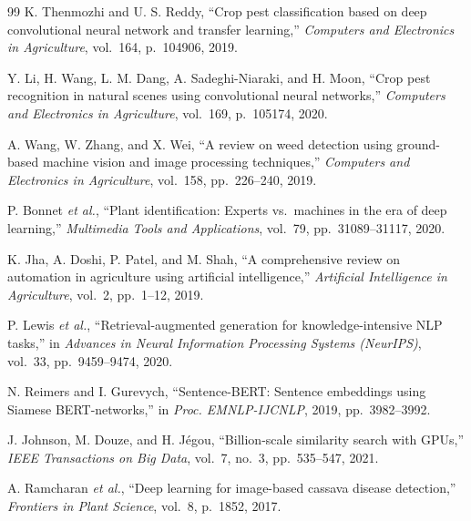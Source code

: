 \begin{thebibliography}{99}
K. Thenmozhi and U. S. Reddy, ``Crop pest classification based on deep convolutional neural network and transfer learning,'' \textit{Computers and Electronics in Agriculture}, vol.~164, p.~104906, 2019.

Y. Li, H. Wang, L. M. Dang, A. Sadeghi-Niaraki, and H. Moon, ``Crop pest recognition in natural scenes using convolutional neural networks,'' \textit{Computers and Electronics in Agriculture}, vol.~169, p.~105174, 2020.

A. Wang, W. Zhang, and X. Wei, ``A review on weed detection using ground-based machine vision and image processing techniques,'' \textit{Computers and Electronics in Agriculture}, vol.~158, pp.~226--240, 2019.

P. Bonnet \textit{et al.}, ``Plant identification: Experts vs.\ machines in the era of deep learning,'' \textit{Multimedia Tools and Applications}, vol.~79, pp.~31089--31117, 2020.

K. Jha, A. Doshi, P. Patel, and M. Shah, ``A comprehensive review on automation in agriculture using artificial intelligence,'' \textit{Artificial Intelligence in Agriculture}, vol.~2, pp.~1--12, 2019.

P. Lewis \textit{et al.}, ``Retrieval-augmented generation for knowledge-intensive NLP tasks,'' in \textit{Advances in Neural Information Processing Systems (NeurIPS)}, vol.~33, pp.~9459--9474, 2020.

N. Reimers and I. Gurevych, ``Sentence-BERT: Sentence embeddings using Siamese BERT-networks,'' in \textit{Proc. EMNLP-IJCNLP}, 2019, pp.~3982--3992.

J. Johnson, M. Douze, and H. J\'{e}gou, ``Billion-scale similarity search with GPUs,'' \textit{IEEE Transactions on Big Data}, vol.~7, no.~3, pp.~535--547, 2021.

A. Ramcharan \textit{et al.}, ``Deep learning for image-based cassava disease detection,'' \textit{Frontiers in Plant Science}, vol.~8, p.~1852, 2017.

\end{thebibliography}

\newpage
